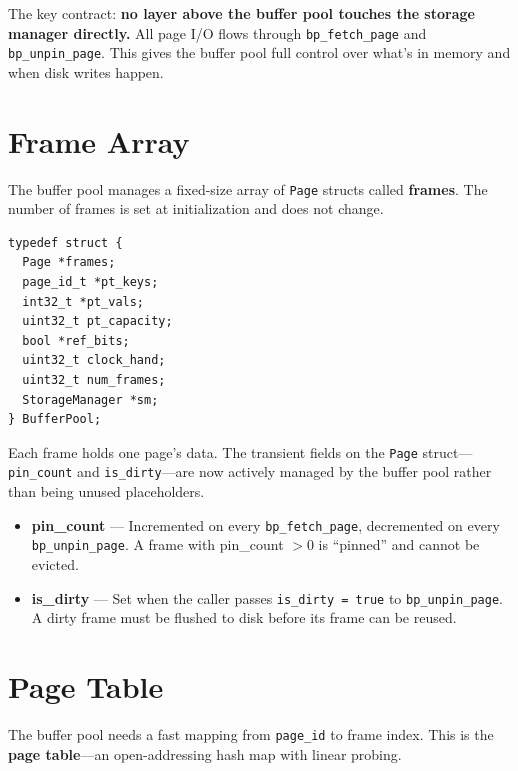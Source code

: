 \documentclass[12pt, a4paper]{report}
\begin{document}
The key contract: \textbf{no layer above the buffer pool touches the storage
manager directly.} All page I/O flows through \texttt{bp\_fetch\_page} and
\texttt{bp\_unpin\_page}. This gives the buffer pool full control over what's
in memory and when disk writes happen.


\section{Frame Array}

The buffer pool manages a fixed-size array of \texttt{Page} structs called
\textbf{frames}. The number of frames is set at initialization and does not
change.

\begin{lstlisting}
typedef struct {
  Page *frames;
  page_id_t *pt_keys;
  int32_t *pt_vals;
  uint32_t pt_capacity;
  bool *ref_bits;
  uint32_t clock_hand;
  uint32_t num_frames;
  StorageManager *sm;
} BufferPool;
\end{lstlisting}

Each frame holds one page's data. The transient fields on the \texttt{Page}
struct---\texttt{pin\_count} and \texttt{is\_dirty}---are now actively managed
by the buffer pool rather than being unused placeholders.

\begin{itemize}[itemsep=4pt]
    \item \textbf{pin\_count} --- Incremented on every \texttt{bp\_fetch\_page},
          decremented on every \texttt{bp\_unpin\_page}. A frame with
          pin\_count $> 0$ is ``pinned'' and cannot be evicted.
    \item \textbf{is\_dirty} --- Set when the caller passes
          \texttt{is\_dirty = true} to \texttt{bp\_unpin\_page}. A dirty
          frame must be flushed to disk before its frame can be reused.
\end{itemize}


\section{Page Table}

The buffer pool needs a fast mapping from \texttt{page\_id} to frame index.
This is the \textbf{page table}---an open-addressing hash map with linear
probing.
\end{document}
